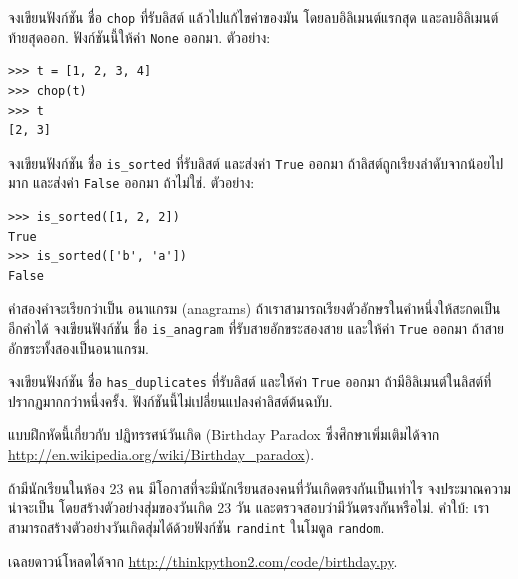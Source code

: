 \begin{exercise}

จงเขียนฟังก์ชัน ชื่อ \texttt{chop} ที่รับลิสต์ 
แล้วไปแก้ไขค่าของมัน โดยลบอิลิเมนต์แรกสุด และลบอิลิเมนต์ท้ายสุดออก.
ฟังก์ชันนี้ให้ค่า \texttt{None} ออกมา.
ตัวอย่าง:

\begin{verbatim}
>>> t = [1, 2, 3, 4]
>>> chop(t)
>>> t
[2, 3]
\end{verbatim}

\end{exercise}
\vspace{0.5cm}


\begin{exercise}
จงเขียนฟังก์ชัน ชื่อ \verb|is_sorted|
ที่รับลิสต์ 
และส่งค่า \texttt{True} ออกมา ถ้าลิสต์ถูกเรียงลำดับจากน้อยไปมาก
และส่งค่า \texttt{False} ออกมา ถ้าไม่ใช่.  
ตัวอย่าง:

\begin{verbatim}
>>> is_sorted([1, 2, 2])
True
>>> is_sorted(['b', 'a'])
False
\end{verbatim}

\end{exercise}
\vspace{0.5cm}


\begin{exercise}
\label{anagram}

คำสองคำจะเรียกว่าเป็น อนาแกรม (anagrams) 
ถ้าเราสามารถเรียงตัวอักษรในคำหนึ่งให้สะกดเป็นอีกคำได้
จงเขียนฟังก์ชัน ชื่อ \verb|is_anagram|
ที่รับสายอักขระสองสาย และให้ค่า \texttt{True} ออกมา ถ้าสายอักขระทั้งสองเป็นอนาแกรม.
\end{exercise}
\vspace{0.5cm}


\begin{exercise}
\label{duplicate}

จงเขียนฟังก์ชัน ชื่อ \verb|has_duplicates| 
ที่รับลิสต์ และให้ค่า \texttt{True} ออกมา
ถ้ามีอิลิเมนต์ในลิสต์ที่ปรากฏมากกว่าหนึ่งครั้ง.
ฟังก์ชันนี้ไม่เปลี่ยนแปลงค่าลิสต์ต้นฉบับ.

\end{exercise}
\vspace{0.5cm}


\begin{exercise}
แบบฝึกหัดนี้เกี่ยวกับ ปฏิทรรศน์วันเกิด (Birthday Paradox ซึ่งศึกษาเพิ่มเติมได้จาก \url{http://en.wikipedia.org/wiki/Birthday_paradox}).

ถ้ามีนักเรียนในห้อง 23 คน มีโอกาสที่จะมีนักเรียนสองคนที่วันเกิดตรงกันเป็นเท่าไร
จงประมาณความน่าจะเป็น โดยสร้างตัวอย่างสุ่มของวันเกิด 23 วัน และตรวจสอบว่ามีวันตรงกันหรือไม่.
คำใบ้: เราสามารถสร้างตัวอย่างวันเกิดสุ่มได้ด้วยฟังก์ชัน \texttt{randint} ในโมดูล \texttt{random}.

เฉลยดาวน์โหลดได้จาก \url{http://thinkpython2.com/code/birthday.py}.

\end{exercise}
\vspace{0.5cm}


